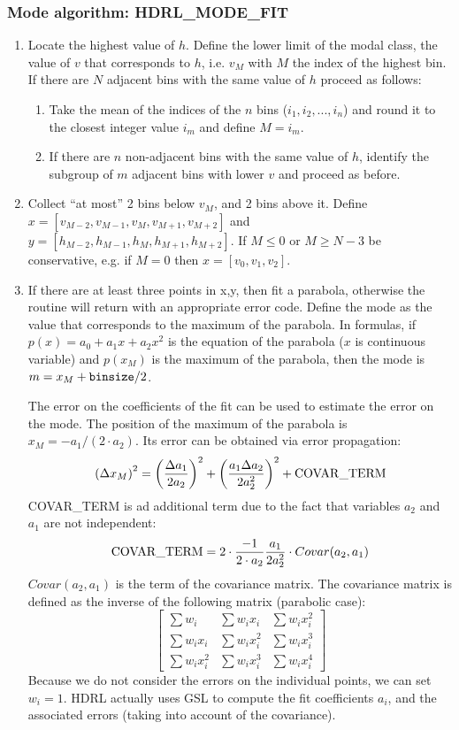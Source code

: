 \subsubsection{Mode algorithm: HDRL\_MODE\_FIT}
\label{sec:algorithms:robust_mean:mode_fit}

\begin{enumerate}
\item Locate the highest value of $h$. Define the lower limit of the
  modal class, the value of $v$ that corresponds to $h$, i.e. $v_M$
  with $M$ the index of the highest bin. If there are $N$ adjacent
  bins with the same value of $h$ proceed as follows:
  \begin{enumerate}
    \item Take the mean of the indices of the $n$ bins ($i_1, i_2, ..., i_n$) and round it to the closest integer value $i_m$ and define $M=i_m$.
    \item If there are $n$ non-adjacent bins with the same value of $h$,
      identify the subgroup of $m$ adjacent bins with lower $v$ and
      proceed as before.
    \end{enumerate}
  \item Collect ``at most'' 2 bins below $v_M$, and 2 bins above it. Define $x=[v_{M-2},v_{M-1},v_M,v_{M+1},v_{M+2}]$ and 
$y=[h_{M-2},h_{M-1},h_M,h_{M+1},h_{M+2}]$. If $M\leq 0$ or $M\geq N-3$ be conservative, e.g. if $M=0$ then $x = [v_0,v_1,v_2]$.
\item If there are at least three points in x,y, then fit a parabola,
  otherwise the routine will return with an appropriate error code. Define
  the mode as the value that corresponds to the maximum of the
  parabola.  In formulas, if $p(x)=a_0+a_1x+a_2x^2$ is the equation of
  the parabola ($x$ is continuous variable) and $p(x_M)$ is the
  maximum of the parabola, then the mode is $m = x_M+{\tt binsize}/2$.

  The error on the coefficients of the fit can be used to estimate the
  error on the mode.  The position of the maximum of the parabola is
  $x_M=-a_1/ (2 \cdot a_2)$. Its error can be obtained via error
  propagation:
  \[
    \left( \Delta x_M \right)^2 = \left( \frac{\Delta a_1}{2a_2} \right)^2 +\left( \frac{a_1 \Delta a_2}{2a_2^2} \right)^2 + {\rm COVAR\_TERM}
  \]
  COVAR\_TERM is ad additional term due to the fact that variables $a_2$ and $a_1$ are not independent:
  \[
    {\rm COVAR\_TERM} =  2\cdot \frac{-1}{2\cdot a_2} \frac{a_1}{2a_2^2} \cdot Covar(a_2,a_1)
  \]
  $Covar(a_2,a_1)$ is the term of the covariance matrix. The covariance matrix is defined as the inverse of the following matrix (parabolic case):
\[
  \begin{bmatrix}
    \sum w_i        &   \sum w_i x_i    &  \sum w_i  x_i^2 \\
    \sum w_i x_i    &   \sum w_i x_i^2  &  \sum w_i  x_i^3 \\
    \sum w_i x_i^2  &   \sum w_i x_i^3  &  \sum w_i  x_i^4 
  \end{bmatrix}
  \]
  Because we do not consider the errors on the individual points, we can set $w_i = 1$. HDRL actually uses GSL to compute the fit coefficients $a_{i}$, and the associated errors (taking into account of the covariance). 


\end{enumerate}
